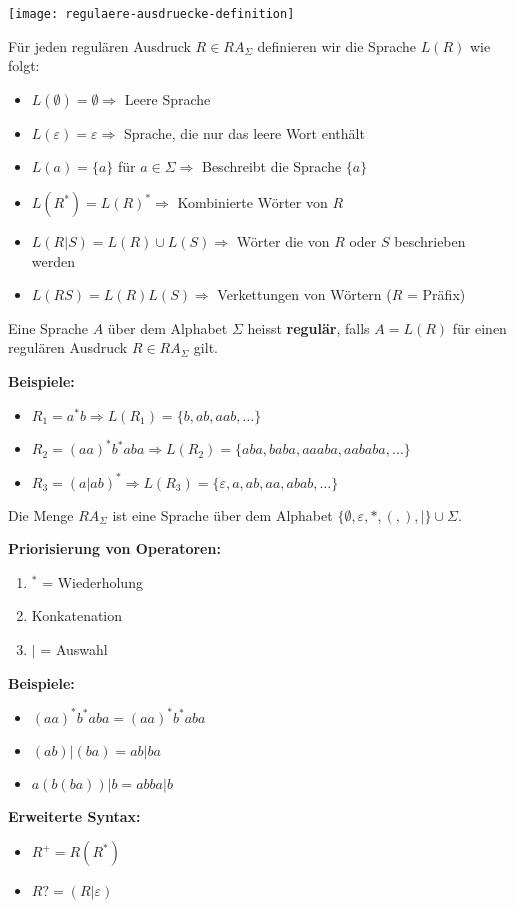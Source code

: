 
\texttt{[image: regulaere-ausdruecke-definition]}

Für jeden regulären Ausdruck $R \in RA_{\Sigma}$ definieren wir die Sprache $L(R)$ wie folgt:
\begin{itemize}
    \item $L(\emptyset) = \emptyset \Rightarrow$ Leere Sprache
    \item $L(\varepsilon) = {\varepsilon} \Rightarrow$ Sprache, die nur das leere Wort enthält
    \item $L(a) = \{a\}$ für $a \in \Sigma \Rightarrow$ Beschreibt die Sprache $\{a\}$
    \item $L(R^*) = L(R)^* \Rightarrow$ Kombinierte Wörter von $R$
    \item $L(R|S) = L(R) \cup L(S) \Rightarrow$ Wörter die von $R$ oder $S$ beschrieben werden
    \item $L(RS) = L(R)L(S) \Rightarrow$ Verkettungen von Wörtern ($R$ = Präfix)
\end{itemize}

Eine Sprache $A$ über dem Alphabet $\Sigma$ heisst \textbf{regulär}, falls $A = L(R)$ für einen regulären Ausdruck $R \in RA_{\Sigma}$ gilt.

\textbf{Beispiele:}
\begin{itemize}
    \item $R_1 = a^* b \Rightarrow L(R_1) = \{b, ab, aab, \dots\}$
    \item $R_2 = (aa)^* b^* aba \Rightarrow L(R_2) = \{aba, baba, aaaba, aababa, \dots\}$
    \item $R_3 = (a|ab)^* \Rightarrow L(R_3) = \{\varepsilon, a, ab, aa, abab, \dots\}$
\end{itemize}

Die Menge $RA_{\Sigma}$ ist eine Sprache über dem Alphabet $\{\emptyset, \varepsilon, *, (,), |\} \cup \Sigma$.

\textbf{Priorisierung von Operatoren:}
\begin{enumerate}
    \item $^*$ = Wiederholung
    \item Konkatenation
    \item $|$ = Auswahl
\end{enumerate}

\textbf{Beispiele:}
\begin{itemize}
    \item $(aa)^* b^* aba = (aa)^* b^* aba$
    \item $(ab)|(ba) = ab|ba$
    \item $a(b(ba))|b = abba | b$
\end{itemize}

\textbf{Erweiterte Syntax:}
\begin{multicols}{2}
    \begin{itemize}
        \item $R^+ = R(R^*)$
        \item $R? = (R|\varepsilon)$
    \end{itemize}
\end{multicols}